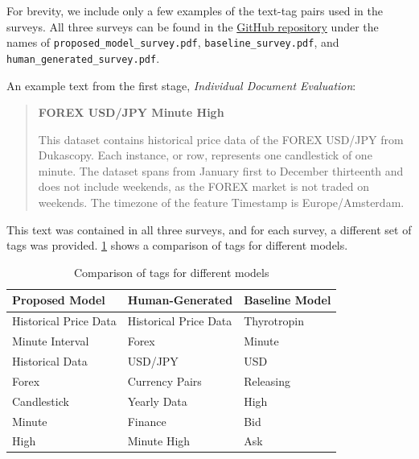 For brevity, we include only a few examples of the text-tag pairs used in the surveys. All three surveys can be found in the \href{https://github.com/ivangermanov/openml-tags}{GitHub repository} \cite{germanov_topic_modeling_of_2024} under the names of \texttt{proposed\_model\_survey.pdf}, \texttt{baseline\_survey.pdf}, and \texttt{human\_generated\_survey.pdf}.

An example text from the first stage, \textit{Individual Document Evaluation}:

\begin{quote}
    \textbf{FOREX USD/JPY Minute High}

    This dataset contains historical price data of the FOREX USD/JPY from Dukascopy. Each instance, or row, represents one candlestick of one minute. The dataset spans from January first to December thirteenth and does not include weekends, as the FOREX market is not traded on weekends. The timezone of the feature Timestamp is Europe/Amsterdam.
\end{quote}

This text was contained in all three surveys, and for each survey, a different set of tags was provided. \cref{tab:tag_comparison} shows a comparison of tags for different models.

\begin{table}[h]
    \centering
    \begin{tabular}{|>{\raggedright\arraybackslash}p{4cm}|>{\raggedright\arraybackslash}p{4cm}|>{\raggedright\arraybackslash}p{4cm}|}
        \hline
        \textbf{Proposed Model} & \textbf{Human-Generated} & \textbf{Baseline Model} \\ \hline
        Historical Price Data   & Historical Price Data    & Thyrotropin             \\ \hline
        Minute Interval         & Forex                    & Minute                  \\ \hline
        Historical Data         & USD/JPY                  & USD                     \\ \hline
        Forex                   & Currency Pairs           & Releasing               \\ \hline
        Candlestick             & Yearly Data              & High                    \\ \hline
        Minute                  & Finance                  & Bid                     \\ \hline
        High                    & Minute High              & Ask                     \\ \hline
    \end{tabular}
    \caption{Comparison of tags for different models}
    \label{tab:tag_comparison}
\end{table}

